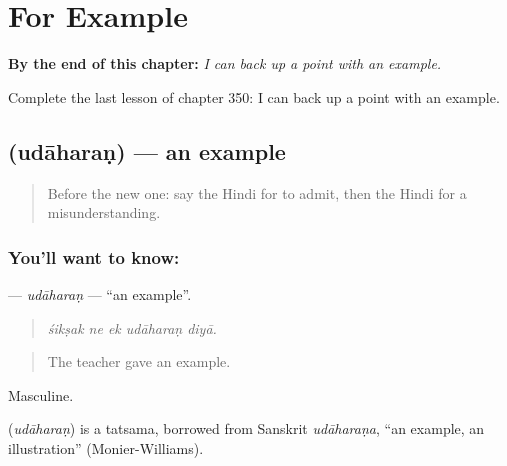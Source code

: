 
\chapter{For Example}
\label{ch:hi-for-example}

\begin{chapteropening}
\textbf{By the end of this chapter:} \emph{I can back up a point with an example.}

Complete the last lesson of chapter 350: I can back up a point with an example.
\end{chapteropening}

\section[\texorpdfstring{\hi{उदाहरण} (udāharaṇ)}{उदाहरण (udāharaṇ)}]{ (udāharaṇ) — an example}

\label{lesson:HI-C350-udaharan}



\begin{quote}
Before the new one: say the Hindi for to admit, then the Hindi for a misunderstanding.
\end{quote}

\subsection*{You'll want to know: }
\textbf{} — \emph{udāharaṇ} — \textquotedblleft{}an example\textquotedblright{}.

\begin{quote}
    
\end{quote}

\begin{quote}
\emph{śikṣak ne ek udāharaṇ diyā.}
\end{quote}

\begin{quote}
The teacher gave an example.
\end{quote}

Masculine.

\begin{cousinweb}
\textbf{} (\emph{udāharaṇ}) is a tatsama, borrowed from Sanskrit \emph{udāharaṇa}, \textquotedblleft{}an example, an illustration\textquotedblright{} (Monier-Williams).
\end{cousinweb}

